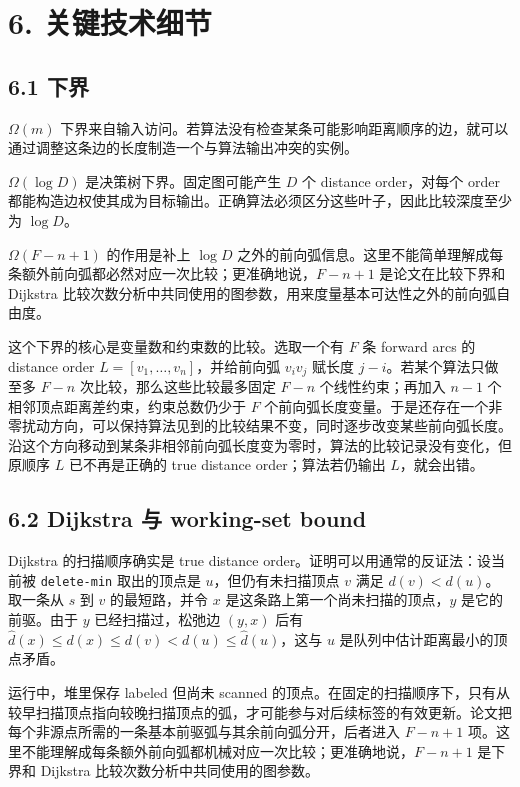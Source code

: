 \section*{6. 关键技术细节}
\subsection*{6.1 下界}
\(\Omega(m)\) 下界来自输入访问。若算法没有检查某条可能影响距离顺序的边，就可以通过调整这条边的长度制造一个与算法输出冲突的实例。

\(\Omega(\log D)\) 是决策树下界。固定图可能产生 \(D\) 个 distance order，对每个 order 都能构造边权使其成为目标输出。正确算法必须区分这些叶子，因此比较深度至少为 \(\log D\)。

\(\Omega(F-n+1)\) 的作用是补上 \(\log D\) 之外的前向弧信息。这里不能简单理解成每条额外前向弧都必然对应一次比较；更准确地说，\(F-n+1\) 是论文在比较下界和 Dijkstra 比较次数分析中共同使用的图参数，用来度量基本可达性之外的前向弧自由度。

这个下界的核心是变量数和约束数的比较。选取一个有 \(F\) 条 forward arcs 的 distance order \(L=[v_1,\ldots,v_n]\)，并给前向弧 \(v_i v_j\) 赋长度 \(j-i\)。若某个算法只做至多 \(F-n\) 次比较，那么这些比较最多固定 \(F-n\) 个线性约束；再加入 \(n-1\) 个相邻顶点距离差约束，约束总数仍少于 \(F\) 个前向弧长度变量。于是还存在一个非零扰动方向，可以保持算法见到的比较结果不变，同时逐步改变某些前向弧长度。沿这个方向移动到某条非相邻前向弧长度变为零时，算法的比较记录没有变化，但原顺序 \(L\) 已不再是正确的 true distance order；算法若仍输出 \(L\)，就会出错。

\subsection*{6.2 Dijkstra 与 working-set bound}
Dijkstra 的扫描顺序确实是 true distance order。证明可以用通常的反证法：设当前被 \texttt{delete-\allowbreak{}min} 取出的顶点是 \(u\)，但仍有未扫描顶点 \(v\) 满足 \(d(v)<d(u)\)。取一条从 \(s\) 到 \(v\) 的最短路，并令 \(x\) 是这条路上第一个尚未扫描的顶点，\(y\) 是它的前驱。由于 \(y\) 已经扫描过，松弛边 \((y,x)\) 后有 \(\hat d(x)\le d(x)\le d(v)<d(u)\le \hat d(u)\)，这与 \(u\) 是队列中估计距离最小的顶点矛盾。

运行中，堆里保存 labeled 但尚未 scanned 的顶点。在固定的扫描顺序下，只有从较早扫描顶点指向较晚扫描顶点的弧，才可能参与对后续标签的有效更新。论文把每个非源点所需的一条基本前驱弧与其余前向弧分开，后者进入 \(F-n+1\) 项。这里不能理解成每条额外前向弧都机械对应一次比较；更准确地说，\(F-n+1\) 是下界和 Dijkstra 比较次数分析中共同使用的图参数。

